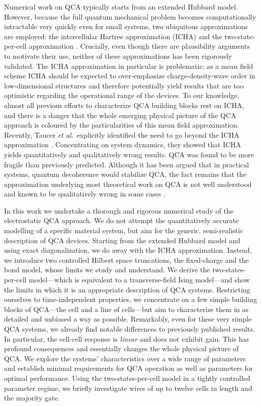 Numerical work on QCA typically starts from an extended Hubbard model. However,
because the full quantum mechanical problem becomes computationally intractable
very quickly even for small systems, two ubiquitous approximations are employed:
the intercellular Hartree approximation (ICHA) and the two-state-per-cell
approximation \cite{lent1993quantum} \cite{tougaw1996dynamic}. Crucially, even
though there are plausibility arguments to motivate their use, neither of these
approximations has been rigorously validated. The ICHA approximation in
particular is problematic: as a mean field scheme ICHA should be expected to
over-emphasize charge-density-wave order in low-dimensional structures and
therefore potentially yield results that are too optimistic regarding the
operational range of the devices. To our knowledge, almost all previous efforts
to characterize QCA building blocks rest on ICHA, and there is a danger that the
whole emerging physical picture of the QCA approach is coloured by the
particularities of this mean field approximation. Recently, Taucer \emph{et
al}.~explicitly identified the need to go beyond the ICHA approximation
\cite{taucer2012consequences}. Concentrating on system dynamics, they showed that
ICHA yields quantitatively and qualitatively wrong results. QCA was found to be
more fragile than previously predicted. Although it has been argued that in
practical systems, quantum decoherence would stabilize QCA, the fact remains
that the approximation underlying most theoretical work on QCA is not well
understood and known to be qualitatively wrong in some cases
\cite{blair2013environmental}.

In this work we undertake a thorough and rigorous numerical study of the
electrostatic QCA approach. We do not attempt the quantitatively accurate
modelling of a specific material system, but aim for the generic, semi-realistic
description of QCA devices. Starting from the extended Hubbard model and using
exact diagonalization, we do away with the ICHA approximation. Instead, we
introduce two controlled Hilbert space truncations, the fixed-charge and the
bond model, whose limits we study and understand. We derive the
two-states-per-cell model---which is equivalent to a transverse-field Ising
model---and show the limits in which it is an appropriate description of QCA
systems. Restricting ourselves to time-independent properties, we concentrate on
a few simple building blocks of QCA---the cell and a line of cells---but aim to
characterize them in as detailed and unbiased a way as possible. Remarkably,
even for these very simple QCA systems, we already find notable differences to
previously published results. In particular, the cell-cell response is
\emph{linear} and does not exhibit gain. This has profound consequences and
essentially changes the whole physical picture of QCA. We explore the systems'
characteristics over a wide range of parameters and establish minimal
requirements for QCA operation as well as parameters for optimal performance.
Using the two-states-per-cell model in a tightly controlled parameter regime, we
briefly investigate wires of up to twelve cells in length and the majority gate.


